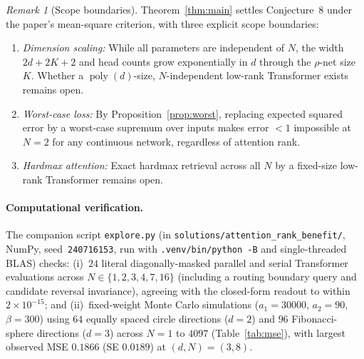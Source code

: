 \documentclass[11pt]{article}
\theoremstyle{plain}
\theoremstyle{definition}
\theoremstyle{remark}
\newtheorem{remark}{Remark}
\begin{document}
\begin{remark}[Scope boundaries]
Theorem~\ref{thm:main} settles Conjecture~8 under the paper's mean-square criterion, with three explicit scope boundaries:
\begin{enumerate}[label=\textup{(\alph*)},leftmargin=2.2em,itemsep=1pt]
\item \emph{Dimension scaling:} While all parameters are independent of $N$, the width $2d + 2K + 2$ and head counts grow exponentially in $d$ through the $\rho$-net size $K$. Whether a $\operatorname{poly}(d)$-size, $N$-independent low-rank Transformer exists remains open.
\item \emph{Worst-case loss:} By Proposition~\ref{prop:worst}, replacing expected squared error by a worst-case supremum over inputs makes error $< 1$ impossible at $N = 2$ for any continuous network, regardless of attention rank.
\item \emph{Hardmax attention:} Exact hardmax retrieval across all $N$ by a fixed-size low-rank Transformer remains open.
\end{enumerate}
\end{remark}

\paragraph{Computational verification.}
The companion script \texttt{explore.py} (in \texttt{solutions/\allowbreak attention\_\allowbreak rank\_\allowbreak benefit/}, NumPy, seed~\texttt{240716153}, run with \texttt{.venv/bin/python -B} and single-threaded BLAS) checks:
(i)~$24$ literal diagonally-masked parallel and serial Transformer evaluations across $N \in \{1, 2, 3, 4, 7, 16\}$ (including a routing boundary query and candidate reversal invariance), agreeing with the closed-form readout to within $2 \times 10^{-15}$; and
(ii)~fixed-weight Monte Carlo simulations ($a_1 = 30000$, $a_2 = 90$, $\beta = 300$) using $64$ equally spaced circle directions ($d = 2$) and $96$ Fibonacci-sphere directions ($d = 3$) across $N = 1$ to $4097$ (Table~\ref{tab:mse}), with largest observed MSE $0.1866$ (SE $0.0189$) at $(d, N) = (3, 8)$.
\end{document}
